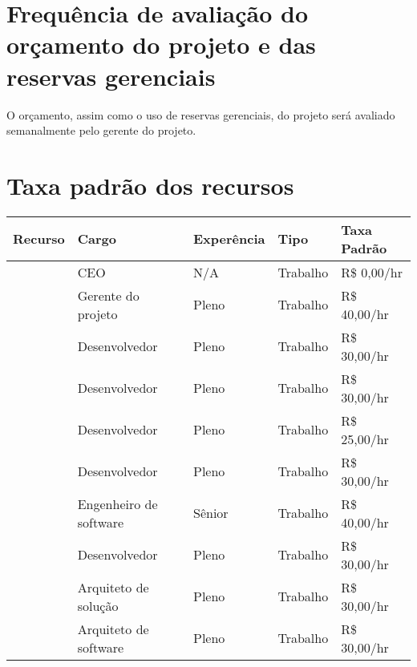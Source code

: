 \section{Frequência de avaliação do orçamento do projeto e das reservas gerenciais}

O orçamento, assim como o uso de reservas gerenciais, do projeto será avaliado semanalmente pelo gerente do projeto.

\section{Taxa padrão dos recursos}

\begin{longtable}{ p{} p{} l l l }
	\toprule
	\textbf{Recurso}      & \textbf{Cargo}             & \textbf{Experência} & \textbf{Tipo} & \textbf{Taxa Padrão} \\
	\midrule
	\ceoName{}            & CEO                        & N/A                  & Trabalho      & R\$ 0,00/hr           \\
	\midrule
	\projectManagerName{} & Gerente do projeto         & Pleno                & Trabalho      & R\$ 40,00/hr          \\
	\midrule
	\mobDevOneName{}      & Desenvolvedor              & Pleno                & Trabalho      & R\$ 30,00/hr          \\
	\midrule
	\mobDevTwoName{}      & Desenvolvedor              & Pleno                & Trabalho      & R\$ 30,00/hr          \\
	\midrule
	\frontWebDevName{}    & Desenvolvedor              & Pleno                & Trabalho      & R\$ 25,00/hr          \\
	\midrule
	\backWebDevName{}     & Desenvolvedor              & Pleno                & Trabalho      & R\$ 30,00/hr          \\
	\midrule
	\softEngName{}        & Engenheiro de software     & Sênior              & Trabalho      & R\$ 40,00/hr          \\
	\midrule
	\sysDevName{}         & Desenvolvedor              & Pleno                & Trabalho      & R\$ 30,00/hr          \\
	\midrule
	\solArcName{}         & Arquiteto de solução     & Pleno                & Trabalho      & R\$ 30,00/hr          \\
	\midrule
	\softArcName{}        & Arquiteto de software      & Pleno                & Trabalho      & R\$ 30,00/hr          \\

\end{longtable}
